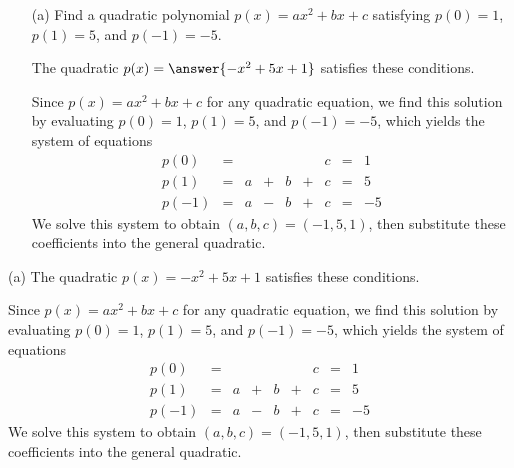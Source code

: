 \documentclass{ximera}
\begin{document}
\begin{exercise} \label{c2.1.11}
\begin{itemize}
\item[(a)] Find a quadratic polynomial $p(x) = ax^2 + bx + c$
  satisfying $p(0) = 1$, $p(1) = 5$, and $p(-1) = -5$.
  \begin{prompt}
    The quadratic $p(x) = \answer{-x^2 + 5x + 1}$ satisfies these conditions.
  \end{prompt}
  \begin{hint}
    Since $p(x) = ax^2 + bx + c$ for any quadratic equation, we find
this solution by evaluating $p(0) = 1$, $p(1) = 5$, and $p(-1) = -5$,
which yields the system of equations
\[
\begin{array}{lrrrrrrrr}
p(0) & = & & & & & c & = & 1 \\
p(1) & = & a & + & b & + & c & = & 5 \\
p(-1) & = & a & - & b & + & c & = & -5\end{array}
\]
We solve this system to obtain $(a,b,c) = (-1,5,1)$, then substitute
these coefficients into the general quadratic.
  \end{hint}
\end{itemize}

\begin{solution}

(a) \ans The quadratic $p(x) = -x^2 + 5x + 1$ satisfies these conditions.

\soln Since $p(x) = ax^2 + bx + c$ for any quadratic equation, we find
this solution by evaluating $p(0) = 1$, $p(1) = 5$, and $p(-1) = -5$,
which yields the system of equations
\[
\begin{array}{lrrrrrrrr}
p(0) & = & & & & & c & = & 1 \\
p(1) & = & a & + & b & + & c & = & 5 \\
p(-1) & = & a & - & b & + & c & = & -5\end{array}
\]
We solve this system to obtain $(a,b,c) = (-1,5,1)$, then substitute
these coefficients into the general quadratic.



\end{solution}
\end{exercise}

\problemlabel
\end{document}
